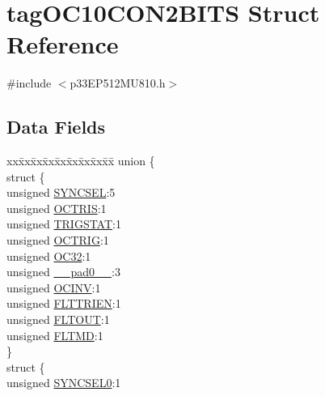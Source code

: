 \hypertarget{structtag_o_c10_c_o_n2_b_i_t_s}{}\section{tag\+O\+C10\+C\+O\+N2\+B\+I\+TS Struct Reference}
\label{structtag_o_c10_c_o_n2_b_i_t_s}


{\ttfamily \#include $<$p33\+E\+P512\+M\+U810.\+h$>$}

\subsection*{Data Fields}
\begin{DoxyCompactItemize}
\item 
\begin{tabbing}
xx\=xx\=xx\=xx\=xx\=xx\=xx\=xx\=xx\=\kill
union \{\\
\>struct \{\\
\>\>unsigned \hyperlink{structtag_o_c10_c_o_n2_b_i_t_s_a35fbbe11485c2615ed27535b62c3fa35}{SYNCSEL}:5\\
\>\>unsigned \hyperlink{structtag_o_c10_c_o_n2_b_i_t_s_ab849a74c6179282ed6b06cc047c80544}{OCTRIS}:1\\
\>\>unsigned \hyperlink{structtag_o_c10_c_o_n2_b_i_t_s_ab379549de54ac93ad4aa73686c34cb7c}{TRIGSTAT}:1\\
\>\>unsigned \hyperlink{structtag_o_c10_c_o_n2_b_i_t_s_a8d2cf9b996ef2b9079defa8950de798c}{OCTRIG}:1\\
\>\>unsigned \hyperlink{structtag_o_c10_c_o_n2_b_i_t_s_af52e127483a703e0fa84c7d4f1de0df4}{OC32}:1\\
\>\>unsigned \hyperlink{structtag_o_c10_c_o_n2_b_i_t_s_adf71f3d8410c1f1dbbc96680a92c49af}{\_\_pad0\_\_}:3\\
\>\>unsigned \hyperlink{structtag_o_c10_c_o_n2_b_i_t_s_a301004fca40c8d19d418866c92c19a06}{OCINV}:1\\
\>\>unsigned \hyperlink{structtag_o_c10_c_o_n2_b_i_t_s_ab979b75e02643aa840fb6ee50e0c30fa}{FLTTRIEN}:1\\
\>\>unsigned \hyperlink{structtag_o_c10_c_o_n2_b_i_t_s_ae466664b094d9c830e9ce20b86d7907f}{FLTOUT}:1\\
\>\>unsigned \hyperlink{structtag_o_c10_c_o_n2_b_i_t_s_a245ca3019d6c6ccbfb09f1c821146bb5}{FLTMD}:1\\
\>\} \\
\>struct \{\\
\>\>unsigned \hyperlink{structtag_o_c10_c_o_n2_b_i_t_s_a3b5df3154fde5141e6ac0156425ff8b4}{SYNCSEL0}:1\\

\end{tabbing}
\end{DoxyCompactItemize}
